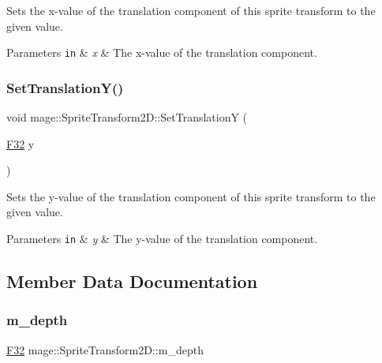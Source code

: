Sets the x-\/value of the translation component of this sprite transform to the given value.


\begin{DoxyParams}[1]{Parameters}
\mbox{\tt in}  & {\em x} & The x-\/value of the translation component. \\
\hline
\end{DoxyParams}
\mbox{\label{classmage_1_1_sprite_transform2_d_ae4cb2b619c8a16f97cc854e3a2b99b10}} 
\subsubsection{\texorpdfstring{Set\+Translation\+Y()}{SetTranslationY()}}
{\footnotesize\ttfamily void mage\+::\+Sprite\+Transform2\+D\+::\+Set\+TranslationY (\begin{DoxyParamCaption}\item[{\mbox{\hyperlink{namespacemage_aa97e833b45f06d60a0a9c4fc22ae02c0}{F32}}}]{y }\end{DoxyParamCaption})\hspace{0.3cm}{\ttfamily [noexcept]}}

Sets the y-\/value of the translation component of this sprite transform to the given value.


\begin{DoxyParams}[1]{Parameters}
\mbox{\tt in}  & {\em y} & The y-\/value of the translation component. \\
\hline
\end{DoxyParams}


\subsection{Member Data Documentation}
\mbox{\label{classmage_1_1_sprite_transform2_d_a7878b5e80b281cfe5742c4e6c92e155b}} 
\subsubsection{\texorpdfstring{m\+\_\+depth}{m\_depth}}
{\footnotesize\ttfamily \mbox{\hyperlink{namespacemage_aa97e833b45f06d60a0a9c4fc22ae02c0}{F32}} mage\+::\+Sprite\+Transform2\+D\+::m\+\_\+depth\hspace{0.3cm}{\ttfamily [private]}}

